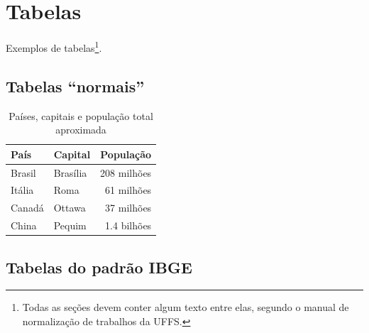 \documentclass[serif]{uffstex}
\begin{document}
\chapter{Tabelas}

Exemplos de tabelas\footnote{Todas as seções devem conter algum texto entre elas, segundo o manual de normalização de trabalhos da UFFS.}.

\section{Tabelas \enquote{normais}}

\begin{table}[h]
  \centering
  \caption{Países, capitais e população total aproximada}
  \begin{tabular}{@{}llr@{}}
    \toprule %
    País   & Capital  & População\footnotemark\\
    \midrule %
    Brasil & Brasília & 208 milhões\\
    Itália & Roma     & 61 milhões\\
    Canadá & Ottawa   & 37 milhões\\
    China  & Pequim   & 1.4 bilhões\\
    \bottomrule %
  \end{tabular}
  \label{tab:paises}
\end{table}

\section{Tabelas do padrão IBGE}
\end{document}
